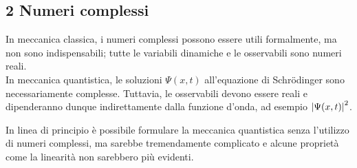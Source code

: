 \subsection*{2 Numeri complessi}

In meccanica classica, i numeri complessi possono essere utili formalmente, ma non sono indispensabili;
tutte le variabili dinamiche e le osservabili sono numeri reali.\\
In meccanica quantistica, le soluzioni \(\Psi(x,t)\) all'equazione di Schrödinger sono necessariamente complesse. 
Tuttavia, le osservabili devono essere reali e dipenderanno dunque indirettamente dalla funzione d'onda, ad esempio \(\abs{\Psi(x,t)}^2\).

\begin{remark}
    In linea di principio è possibile formulare la meccanica quantistica senza l'utilizzo di numeri complessi,
    ma sarebbe tremendamente complicato e alcune proprietà come la linearità non sarebbero più evidenti.
\end{remark}


